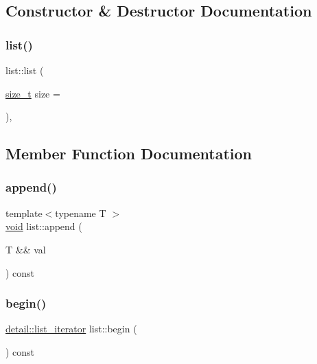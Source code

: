 \subsection{Constructor \& Destructor Documentation}
\mbox{\label{classlist_a605b8e11c689100c84d14f1e8f3ec5ba}} 
\subsubsection{\texorpdfstring{list()}{list()}}
{\footnotesize\ttfamily list\+::list (\begin{DoxyParamCaption}\item[{\mbox{\hyperlink{detail_2common_8h_a801d6a451a01953ef8cbae6feb6a3638}{size\+\_\+t}}}]{size = {} }\end{DoxyParamCaption})\hspace{0.3cm}{\ttfamily [inline]}, {\ttfamily [explicit]}}



\subsection{Member Function Documentation}
\mbox{\label{classlist_a150b194a333339dc1f248dff200adaf8}} 
\subsubsection{\texorpdfstring{append()}{append()}}
{\footnotesize\ttfamily template$<$typename T $>$ \\
\mbox{\hyperlink{_s_d_l__opengles2__gl2ext_8h_ae5d8fa23ad07c48bb609509eae494c95}{void}} list\+::append (\begin{DoxyParamCaption}\item[{T \&\&}]{val }\end{DoxyParamCaption}) const\hspace{0.3cm}{\ttfamily [inline]}}

\mbox{\label{classlist_a64e9fbac58507bf5ee4683bb0d5b6862}} 
\subsubsection{\texorpdfstring{begin()}{begin()}}
{\footnotesize\ttfamily \mbox{\hyperlink{pytypes_8h_a185da221b77a3f194e5764f8b6babb1d}{detail\+::list\+\_\+iterator}} list\+::begin (\begin{DoxyParamCaption}{ }\end{DoxyParamCaption}) const\hspace{0.3cm}{\ttfamily [inline]}}

